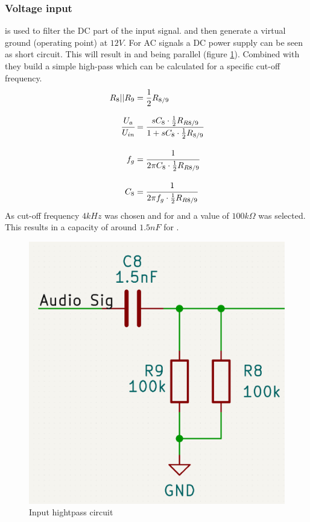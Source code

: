 \subsubsection*{Voltage input}
%
 is used to filter the DC part of the input signal.  and  then generate a virtual ground (operating point) at $12V$. For AC signals a DC power supply can be seen as short circuit. This will result in  and  being parallel (figure \ref{fig:pcb:amp_hp}). Combined with  they build a simple high-pass which can be calculated for a specific cut-off frequency.
%
\begin{align}
  R_8 || R_9 &= \frac{1}{2} R_{8/9} \pmath
  \cfrac{U_a}{U_{in}} &= \cfrac{sC_8\cdot \frac{1}{2}R_{R8/9}}{1 + sC_8\cdot \frac{1}{2}R_{8/9}} \pmath
  f_g &= \cfrac{1}{2 \pi C_8 \cdot \frac{1}{2}R_{R8/9}} \pmath
  C_8 &= \cfrac{1}{2 \pi f_g \cdot \frac{1}{2}R_{R8/9}}
\end{align}
%
As cut-off frequency $4kHz$ was chosen and for  and  a value of $100k\Omega$ was selected. This results in a capacity of around $1.5nF$ for .
%
\begin{figure}
  \centering
  \includegraphics[height=\smallheight]{src/assets/pictures/circuit/amp_hp_circuit.png}
  \caption{Input hightpass circuit}\label{fig:pcb:amp_hp}
\end{figure}
%
